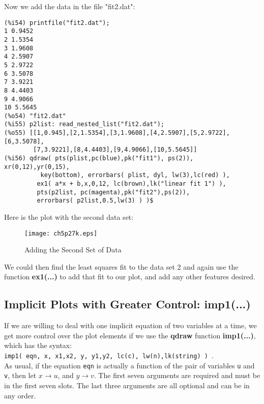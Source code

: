\documentclass[12pt]{article}
\begin{document}
\smallskip
Now we add the data in the file "fit2.dat":
\small
\begin{verbatim}
(%i54) printfile("fit2.dat");
1 0.9452 
2 1.5354 
3 1.9608
4 2.5907
5 2.9722
6 3.5078
7 3.9221
8 4.4403
9 4.9066
10 5.5645
(%o54) "fit2.dat"
(%i55) p2list: read_nested_list("fit2.dat");
(%o55) [[1,0.945],[2,1.5354],[3,1.9608],[4,2.5907],[5,2.9722],[6,3.5078],
        [7,3.9221],[8,4.4403],[9,4.9066],[10,5.5645]]
(%i56) qdraw( pts(plist,pc(blue),pk("fit1"), ps(2)), xr(0,12),yr(0,15),
          key(bottom), errorbars( plist, dyl, lw(3),lc(red) ),
         ex1( a*x + b,x,0,12, lc(brown),lk("linear fit 1") ),
         pts(p2list, pc(magenta),pk("fit2"),ps(2)),
         errorbars( p2list,0.5,lw(3) ) )$		
\end{verbatim}
\normalsize
%
\newpage

Here is the plot with the second data set:
\begin{figure} [h]
   \centerline{\texttt{[image: ch5p27k.eps]} }
	\caption{Adding the Second Set of Data }
\end{figure} 

\smallskip
We could then find the least squares fit to the data set 2 and again use
  the function \textbf{ex1(...)} to add that fit to our plot, and add any
  other features desired.



\newpage
  
\subsection{Implicit Plots with Greater Control: imp1(...) }  
If we are willing to deal with one implicit equation of two
  variables at a time, we get more control over the plot elements if we use
  the \textbf{qdraw} function \textbf{imp1(...)}, which has the syntax:\\
\verb|imp1( eqn, x, x1,x2, y, y1,y2, lc(c), lw(n),lk(string) ) |.\\

\smallskip
As usual, if the equation \verb|eqn| is actually a function of  the pair
  of variables \verb|u| and \verb|v|, then let $x \rightarrow u$,
  and $y \rightarrow v$.
The first seven arguments are required and must be in the first seven slots.
The last three arguments are all optional and can be in any order.
\end{document}
